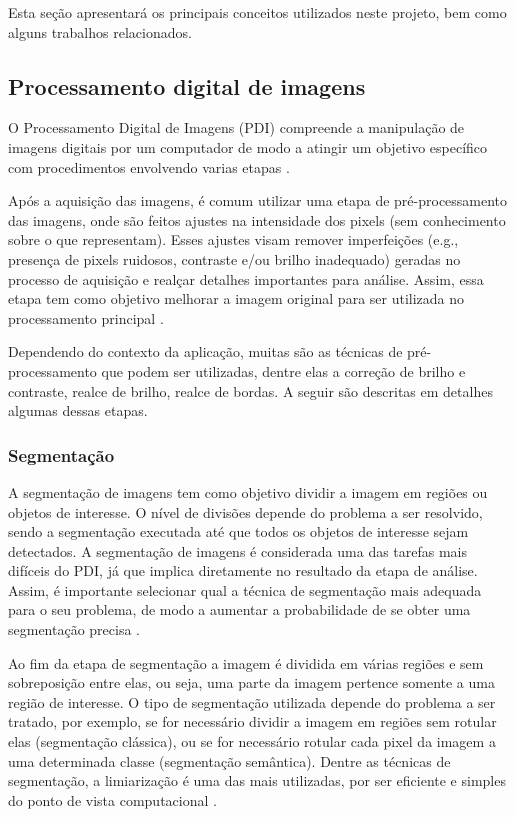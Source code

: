 \documentclass[12pt, a4paper, english, brazil]{article}
\begin{document}
Esta seção apresentará os principais conceitos utilizados neste projeto, bem como alguns trabalhos relacionados.

\subsection{Processamento digital de imagens}

O Processamento Digital de Imagens (PDI) compreende a manipulação de imagens digitais por um computador de modo a atingir um objetivo específico com procedimentos envolvendo varias etapas \cite{Gonzalez_Woods_2010}.

Após a aquisição das imagens, é comum utilizar uma etapa de pré-processamento das imagens, onde são feitos ajustes na intensidade dos pixels (sem conhecimento sobre o que representam). Esses ajustes visam remover imperfeições (e.g., presença de pixels ruidosos, contraste e/ou brilho inadequado) geradas no processo de aquisição e realçar detalhes importantes para análise. Assim, essa etapa tem como objetivo melhorar a imagem original para ser utilizada no processamento principal \cite{Marques_Filho_1999}.

Dependendo do contexto da aplicação, muitas são as técnicas de pré-processamento que podem ser utilizadas, dentre elas a correção de brilho e contraste, realce de brilho, realce de bordas. A seguir são descritas em detalhes algumas dessas etapas.

\subsubsection{Segmentação}

A segmentação de imagens tem como objetivo dividir a imagem em regiões ou objetos de interesse. O nível de divisões depende do problema a ser resolvido, sendo a segmentação executada até que todos os objetos de interesse sejam detectados. A segmentação de imagens é considerada uma das tarefas mais difíceis do PDI, já que implica diretamente no resultado da etapa de análise. Assim, é importante selecionar qual a técnica de segmentação mais adequada para o seu problema, de modo a aumentar a probabilidade de se obter uma segmentação precisa \cite{Gonzalez_Woods_2010}.

Ao fim da etapa de segmentação a imagem é dividida em várias regiões e sem sobreposição entre elas, ou seja, uma parte da imagem pertence somente a uma região de interesse. O tipo de segmentação utilizada depende do problema a ser tratado, por exemplo, se for necessário dividir a imagem em regiões sem rotular elas (segmentação clássica), ou se for necessário rotular cada pixel da imagem a uma determinada classe (segmentação semântica). Dentre as técnicas de segmentação, a limiarização é uma das mais utilizadas, por ser eficiente e simples do ponto de vista computacional \cite{Kuruvilla_2016}.
\end{document}
